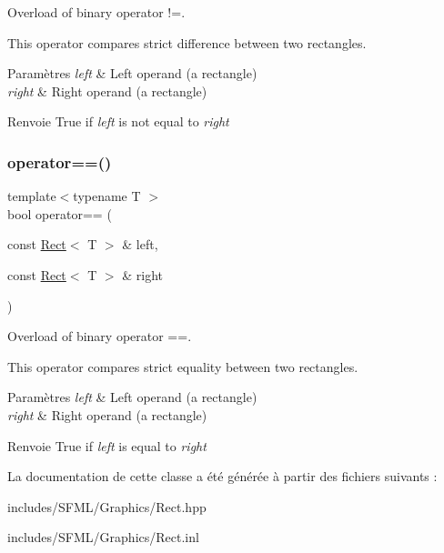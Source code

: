 Overload of binary operator !=. 

This operator compares strict difference between two rectangles.


\begin{DoxyParams}{Paramètres}
{\em left} & Left operand (a rectangle) \\
\hline
{\em right} & Right operand (a rectangle)\\
\hline
\end{DoxyParams}
\begin{DoxyReturn}{Renvoie}
True if {\itshape left} is not equal to {\itshape right} 
\end{DoxyReturn}
\mbox{\label{classsf_1_1Rect_ab3488b5dbd0e587c4d7cb80605affc46}} 
\subsubsection{\texorpdfstring{operator==()}{operator==()}}
{\footnotesize\ttfamily template$<$typename T $>$ \\
bool operator== (\begin{DoxyParamCaption}\item[{const \hyperlink{classsf_1_1Rect}{Rect}$<$ T $>$ \&}]{left,  }\item[{const \hyperlink{classsf_1_1Rect}{Rect}$<$ T $>$ \&}]{right }\end{DoxyParamCaption})\hspace{0.3cm}{\ttfamily [related]}}



Overload of binary operator ==. 

This operator compares strict equality between two rectangles.


\begin{DoxyParams}{Paramètres}
{\em left} & Left operand (a rectangle) \\
\hline
{\em right} & Right operand (a rectangle)\\
\hline
\end{DoxyParams}
\begin{DoxyReturn}{Renvoie}
True if {\itshape left} is equal to {\itshape right} 
\end{DoxyReturn}


La documentation de cette classe a été générée à partir des fichiers suivants \+:\begin{DoxyCompactItemize}
\item 
includes/\+S\+F\+M\+L/\+Graphics/Rect.\+hpp\item 
includes/\+S\+F\+M\+L/\+Graphics/Rect.\+inl\end{DoxyCompactItemize}
